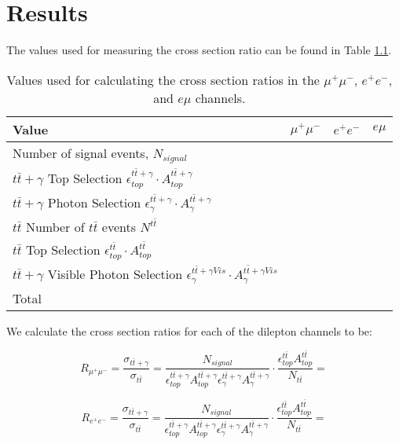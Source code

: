 \chapter{Results} \label{chap-Results}

The values used for measuring the cross section ratio can be found in Table \ref{tab-xsectvariables}.

\begin{table}[h!]
\begin{center}
\begin{tabular}{l|c|c|c}
\hline
\hline
	\textbf{Value} & $\mu^+\mu^-$ & $e^+e^-$ & $e\mu$ \\
\hline
	Number of signal events, $N_{signal}$ & & & \\
	$t\bar{t}+\gamma$ Top Selection $\epsilon^{t\bar{t}+\gamma}_{top} \cdot A^{t\bar{t}+\gamma}_{top}$ & & & \\
	$t\bar{t}+\gamma$ Photon Selection $\epsilon^{t\bar{t}+\gamma}_{\gamma} \cdot A^{t\bar{t}+\gamma}_{\gamma}$ & & & \\
	$t\bar{t}$ Number of $t\bar{t}$ events $N^{t\bar{t}}$ & & & \\
	$t\bar{t}$ Top Selection $\epsilon^{t\bar{t}}_{top} \cdot A^{t\bar{t}}_{top}$ & & & \\
	$t\bar{t}+\gamma$ Visible Photon Selection $\epsilon^{t\bar{t}+\gamma Vis}_{\gamma} \cdot A^{t\bar{t}+\gamma Vis}_{\gamma}$ & & & \\
\hline
	Total & & & \\
\hline
\hline
\end{tabular} 
\end{center}
\caption{Values used for calculating the cross section ratios in the $\mu^+\mu^-$, $e^+e^-$, and $e\mu$ channels.}
\label{tab-xsectvariables}
\end{table}

We calculate the cross section ratios for each of the dilepton channels to be:

\begin{equation}
	R_{\mu^+\mu^-} = \frac{\sigma_{t\bar{t}+\gamma}}{\sigma_{t\bar{t}}} = \frac{N_{signal}}{\epsilon^{t\bar{t}+\gamma}_{top} A^{t\bar{t}+\gamma}_{top} \epsilon^{t\bar{t}+\gamma}_{\gamma} A^{t\bar{t}+\gamma}_{\gamma}} \cdot \frac{\epsilon^{t\bar{t}}_{top} A^{t\bar{t}}_{top}}{N_{t\bar{t}}} = 
\end{equation}

\begin{equation}
	R_{e^+e^-} = \frac{\sigma_{t\bar{t}+\gamma}}{\sigma_{t\bar{t}}} = \frac{N_{signal}}{\epsilon^{t\bar{t}+\gamma}_{top} A^{t\bar{t}+\gamma}_{top} \epsilon^{t\bar{t}+\gamma}_{\gamma} A^{t\bar{t}+\gamma}_{\gamma}} \cdot \frac{\epsilon^{t\bar{t}}_{top} A^{t\bar{t}}_{top}}{N_{t\bar{t}}} = 
\end{equation}

